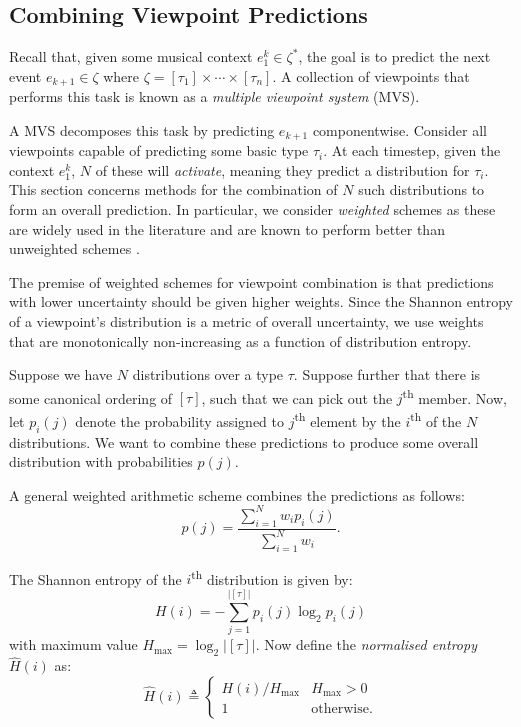 \documentclass[12pt,a4paper,twoside,openright]{report}
\begin{document}
\subsection{Combining Viewpoint Predictions}\label{sec:vp-comb}

Recall that, given some musical context $e_1^k \in \zeta^*$, the goal is to
predict the next event $e_{k+1} \in \zeta$ where $\zeta = [\tau_1] \times \cdots
\times [\tau_n]$.  A collection of viewpoints that performs this task is known
as a \emph{multiple viewpoint system} (MVS). 

A MVS decomposes this task by predicting $e_{k+1}$ componentwise. Consider all
viewpoints capable of predicting some basic type $\tau_i$. At each timestep,
given the context $e_1^k$, $N$ of these will \emph{activate}, meaning they
predict a distribution for $\tau_i$. This section concerns methods for the
combination of $N$ such distributions to form an overall prediction. In
particular, we consider \emph{weighted} schemes as these are widely used in the
literature and are known to perform better than unweighted schemes
\cite{pearce2004combining}.

The premise of weighted schemes for viewpoint combination is that predictions
with lower uncertainty should be given higher weights.  Since the Shannon
entropy of a viewpoint's distribution is a metric of overall uncertainty, we use
weights that are monotonically non-increasing as a function of distribution
entropy.

Suppose we have $N$ distributions over a type $\tau$. Suppose further that there
is some canonical ordering of $[\tau]$, such that we can pick out the
$j$\textsuperscript{th} member. Now, let $p_i(j)$ denote the probability
assigned to $j$\textsuperscript{th} element by the $i$\textsuperscript{th} of the
$N$ distributions. We want to combine these predictions to produce some overall
distribution with
probabilities $p(j)$.

A general weighted arithmetic scheme combines the predictions as follows:
$$
  p(j) = \frac{ \sum_{i = 1}^N w_i p_i(j) }{ \sum_{i = 1}^N w_i }.
$$

The Shannon entropy of the $i$\textsuperscript{th} distribution is given by:
$$ H(i) = - \sum_{j = 1}^{|[\tau]|} p_i(j) \log_2 p_i(j) $$
with maximum value $H_{\mathrm{max}} = \log_2{ |[\tau]| }$. Now define the
\emph{normalised entropy} $\hat{H}(i)$ as:
$$ \hat{H}(i) \triangleq \begin{cases}
  H(i)/H_{\mathrm{max}} & H_{\mathrm{max}} > 0 \\
  1 & \text{otherwise.}
\end{cases} $$
\end{document}
